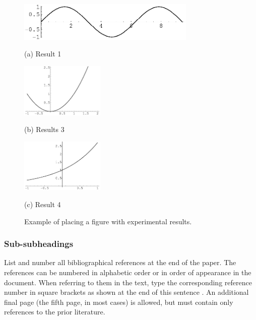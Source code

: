 \documentclass{article}
\begin{document}
\begin{figure}[htb]

\begin{minipage}[b]{1.0\linewidth}
  \centering
  \centerline{\includegraphics[width=8.5cm]{image1.eps}}
  \centerline{(a) Result 1}\medskip
\end{minipage}
%
\begin{minipage}[b]{.48\linewidth}
  \centering
  \centerline{\includegraphics[width=4.0cm]{image3.eps}}
  \centerline{(b) Results 3}\medskip
\end{minipage}
\hfill
\begin{minipage}[b]{0.48\linewidth}
  \centering
  \centerline{\includegraphics[width=4.0cm]{image4.eps}}
  \centerline{(c) Result 4}\medskip
\end{minipage}
%
\caption{Example of placing a figure with experimental results.}
\label{fig:res}
%
\end{figure}


\subsubsection{Sub-subheadings}
\label{sssec:subsubhead}

List and number all bibliographical references at the end of the
paper. The references can be numbered in alphabetic order or in
order of appearance in the document. When referring to them in
the text, type the corresponding reference number in square
brackets as shown at the end of this sentence \cite{dalal2005histograms}. An
additional final page (the fifth page, in most cases) is
allowed, but must contain only references to the prior
literature.
\end{document}
